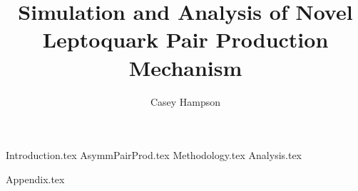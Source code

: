 \documentclass[titlepage]{article}
\title{Simulation and Analysis of Novel Leptoquark Pair Production Mechanism}
\author{Casey Hampson}
\begin{document}
    \maketitle
    \tableofcontents
    \pagebreak

    
    {Introduction.tex}
    {AsymmPairProd.tex}
    {Methodology.tex}
    {Analysis.tex}
            

    \pagebreak
    \appendix
    {Appendix.tex}

    \pagebreak
    
    
    
\end{document}
